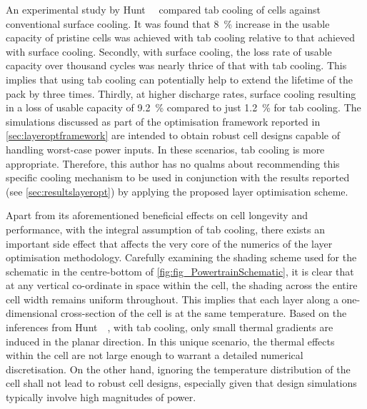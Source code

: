 An  experimental  study  by   Hunt~\etal~\cite{Hunt2016}  compared  tab  cooling
of  cells  against conventional  surface  cooling.  It  was found  that  \approx
\SI{8}{\percent} increase in the usable  capacity of pristine cells was achieved
with tab cooling relative to that  achieved with surface cooling. Secondly, with
surface  cooling, the  loss rate  of usable  capacity over  thousand cycles  was
nearly thrice of that with tab cooling.  This implies that using tab cooling can
potentially help to extend the lifetime of  the pack by three times. Thirdly, at
higher discharge rates,  surface cooling resulting in a loss  of usable capacity
of \SI{9.2}{\percent} compared  to just \SI{1.2}{\percent} for  tab cooling. The
simulations  discussed  as  part  of  the  optimisation  framework  reported  in
\cref{sec:layeroptframework} are intended to  obtain robust cell designs capable
of handling  worst-case power inputs.  In these  scenarios, tab cooling  is more
appropriate.  Therefore,  this author  has  no  qualms about  recommending  this
specific cooling mechanism  to be used in conjunction with  the results reported
(see  \cref{sec:resultslayeropt}) by  applying the  proposed layer  optimisation
scheme.

Apart  from  its  aforementioned  beneficial   effects  on  cell  longevity  and
performance,  with the  integral  assumption  of tab  cooling,  there exists  an
important side effect  that affects the very  core of the numerics  of the layer
optimisation methodology.  Carefully examining the  shading scheme used  for the
schematic  in the  centre-bottom  of  \cref{fig:fig_PowertrainSchematic}, it  is
clear that  at any vertical  co-ordinate in space  within the cell,  the shading
across the entire cell width remains  uniform throughout. This implies that each
layer  along  a  one-dimensional  cross-section  of the  cell  is  at  the  same
temperature. Based  on the inferences from  Hunt~\etal~\cite{Hunt2016}, with tab
cooling, only  small thermal gradients are  induced in the planar  direction. In
this unique scenario,  the thermal effects within the cell  are not large enough
to warrant a detailed numerical discretisation.  On the other hand, ignoring the
temperature distribution  of the  cell shall  not lead  to robust  cell designs,
especially given  that design simulations  typically involve high  magnitudes of
power.

